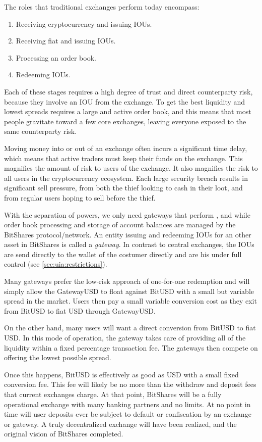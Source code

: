 \label{sec:gateway}

The roles that traditional exchanges perform today encompass:

\begin{enumerate}
 \item Receiving cryptocurrency and issuing IOUs. \label{it:g1}
 \item Receiving fiat and issuing IOUs. \label{it:g2}
 \item Processing an order book.
 \item Redeeming IOUs. \label{it:g3}
\end{enumerate}

Each of these stages requires a high degree of trust and direct counterparty
risk, because they involve an IOU from the exchange. To get the best
liquidity and lowest spreads requires a large and active order book, and this
means that most people gravitate toward a few core exchanges, leaving everyone
exposed to the same counterparty risk.

Moving money into or out of an exchange often incurs a significant time delay,
which means that active traders must keep their funds on the exchange. This
magnifies the amount of risk to users of the exchange. It also magnifies the
risk to all users in the cryptocurrency ecosystem. Each large security breach
results in significant sell pressure, from both the thief looking to cash in
their loot, and from regular users hoping to sell before the thief.

\medskip

With the separation of powers, we only need gateways that perform
\label{it:g1}, \label{it:g2} and \label{it:g3} while order book processing and
storage of account balances are managed by the BitShares protocol/network. An
entity issuing and redeeming IOUs for an other asset in BitShares is called a
\emph{gateway}. In contrast to central exchanges, the IOUs are send directly
to the wallet of the costumer directly and are his under full control (see
\cref{sec:uia:restrictions}).

Many gateways prefer the low-risk approach of one-for-one redemption and will
simply allow the GatewayUSD to float against BitUSD with a small but variable
spread in the market. Users then pay a small variable conversion cost as they
exit from BitUSD to fiat USD through GatewayUSD.

On the other hand, many users will want a direct conversion from BitUSD to fiat
USD. In this mode of operation, the gateway takes care of providing all of the
liquidity within a fixed percentage transaction fee. The gateways then
compete on offering the lowest possible spread.

Once this happens, BitUSD is effectively as good as USD with a small fixed
conversion fee. This fee will likely be no more than the withdraw and deposit
fees that current exchanges charge. At that point, BitShares will be a fully
operational exchange with many banking partners and no limits. At no point in
time will user deposits ever be subject to default or confiscation by an
exchange or gateway. A truly decentralized exchange will have been realized,
and the original vision of BitShares completed.
